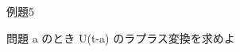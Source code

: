 \begin{frame}{例題5}
  \begin{exampleblock}{問題}
  a  のとき U(t-a) のラプラス変換を求めよ\\[2pt]
  \end{exampleblock}
\end{frame}

